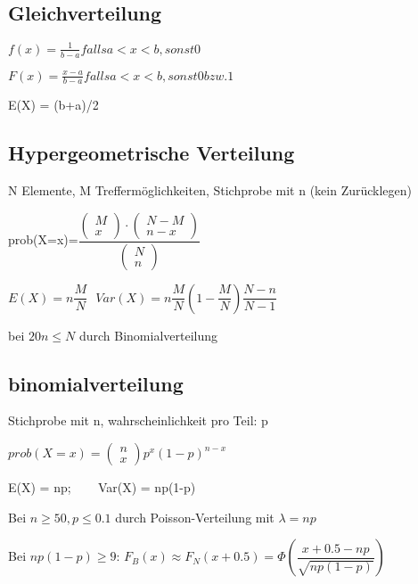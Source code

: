 \newpage

\subsection*{Gleichverteilung}
$f(x) = \frac{1}{b-a} falls a < x < b, sonst 0$

$F(x)  = \frac{x-a}{b-a} falls a < x < b, sonst 0 bzw. 1$

E(X) = (b+a)/2


\subsection*{Hypergeometrische Verteilung}
N Elemente, M Treffermöglichkeiten, Stichprobe mit n (kein Zurücklegen)

prob(X=x)=$ \dfrac{\left( \! \begin{array}{c}M \\ x \end{array} \! \right) \cdot \left( \begin{array}{c}N-M \\ n-x \end{array}  \right) }{\left( \begin{array}{c}N \\ n \end{array}  \right) }$

$E(X)=n\dfrac{M}{N}~~~
Var(X) = n\dfrac{M}{N} \left( 1- \dfrac{M}{N} \right) \dfrac{N-n}{N-1}
$

\Naeherung bei $ 20 n \leq N $  durch Binomialverteilung

\subsection*{binomialverteilung}
Stichprobe mit n, wahrscheinlichkeit pro Teil: p 

$prob(X=x) = \left( \begin{array}{c} n \\ x \end{array} \right) p^x (1-p)^{n-x}$

E(X) = np; ~~~ Var(X) = np(1-p)


\Naeherung  Bei $n \geq 50, p \leq 0.1 $ durch Poisson-Verteilung mit $\lambda = np$

\Naeherung Bei $np(1-p)\geq 9$: $F_B(x) \approx F_N(x+0.5) = \Phi \left( \dfrac{x+0.5 -np}{\sqrt{np(1-p)}}\right)$


